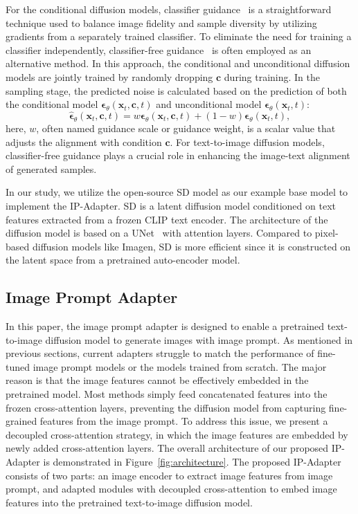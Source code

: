 \documentclass{article}
\begin{document}
For the conditional diffusion models, classifier guidance~\cite{dhariwal2021diffusion} is a straightforward technique used to balance image fidelity and sample diversity by utilizing gradients from a separately trained classifier. To eliminate the need for training a classifier independently, classifier-free guidance~\cite{ho2022classifier} is often employed as an alternative method. In this approach, the conditional and unconditional diffusion models are jointly trained by randomly dropping $\boldsymbol{c}$ during training. In the sampling stage, the predicted noise is calculated based on the prediction of both the conditional model $\boldsymbol{\epsilon}_{\theta}(\boldsymbol{x}_t, \boldsymbol{c}, t)$ and unconditional model $\boldsymbol{\epsilon}_{\theta}(\boldsymbol{x}_t, t)$:
\begin{equation}
\hat{\boldsymbol{\epsilon}}_{\theta}(\boldsymbol{x}_t, \boldsymbol{c}, t) = w\boldsymbol{\epsilon}_{\theta}(\boldsymbol{x}_t, \boldsymbol{c}, t)+(1-w)\boldsymbol{\epsilon}_{\theta}(\boldsymbol{x}_t, t),
\end{equation}
here, $w$, often named guidance scale or guidance weight, is a scalar value that adjusts the alignment with condition $\boldsymbol{c}$. For text-to-image diffusion models, classifier-free guidance plays a crucial role in enhancing the image-text alignment of generated samples.

In our study, we utilize the open-source SD model as our example base model to implement the IP-Adapter. SD is a latent diffusion model conditioned on text features extracted from a frozen CLIP text encoder. The architecture of the diffusion model is based on a UNet~\cite{ronneberger2015u} with attention layers. Compared to pixel-based diffusion models like Imagen, SD is more efficient since it is constructed on the latent space from a pretrained auto-encoder model.
\subsection{Image Prompt Adapter}
In this paper, the image prompt adapter is designed to enable a pretrained text-to-image diffusion model to generate images with image prompt. As mentioned in previous sections, current adapters struggle to match the performance of fine-tuned image prompt models or the models trained from scratch. The major reason is that the image features cannot be effectively embedded in the pretrained model. Most methods simply feed concatenated features into the frozen cross-attention layers, preventing the diffusion model from capturing fine-grained features from the image prompt. To address this issue, we present a decoupled cross-attention strategy, in which the image features are embedded by newly added cross-attention layers. The overall architecture of our proposed IP-Adapter is demonstrated in Figure~\ref{fig:architecture}. The proposed IP-Adapter consists of two parts: an image encoder to extract image features from image prompt, and adapted modules with decoupled cross-attention to embed image features into the pretrained text-to-image diffusion model. 
\end{document}
